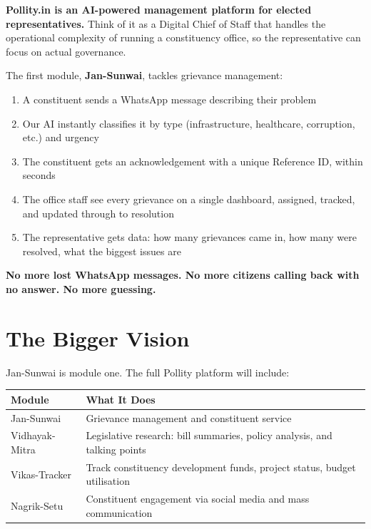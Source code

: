 \documentclass[11pt, a4paper]{article}
\begin{document}
\begin{tcolorbox}[colback=pollityblue!8, colframe=pollityblue, sharp corners, boxrule=0.6pt]
\textbf{Pollity.in is an AI-powered management platform for elected representatives.}
Think of it as a Digital Chief of Staff that handles the operational complexity of running a constituency office, so the representative can focus on actual governance.
\end{tcolorbox}

\vspace{0.8em}

The first module, \textbf{Jan-Sunwai}, tackles grievance management:

\begin{enumerate}[leftmargin=1.5em, itemsep=4pt]
  \item A constituent sends a WhatsApp message describing their problem
  \item Our AI instantly classifies it by type (infrastructure, healthcare, corruption, etc.) and urgency
  \item The constituent gets an acknowledgement with a unique Reference ID, within seconds
  \item The office staff see every grievance on a single dashboard, assigned, tracked, and updated through to resolution
  \item The representative gets data: how many grievances came in, how many were resolved, what the biggest issues are
\end{enumerate}

\vspace{0.5em}

\textbf{No more lost WhatsApp messages. No more citizens calling back with no answer. No more guessing.}

\section{The Bigger Vision}

Jan-Sunwai is module one. The full Pollity platform will include:

\begin{tabularx}{\linewidth}{lX}
\toprule
\textbf{Module} & \textbf{What It Does} \\
\midrule
Jan-Sunwai      & Grievance management and constituent service \\
Vidhayak-Mitra  & Legislative research: bill summaries, policy analysis, and talking points \\
Vikas-Tracker   & Track constituency development funds, project status, budget utilisation \\
Nagrik-Setu     & Constituent engagement via social media and mass communication \\
\bottomrule
\end{tabularx}
\end{document}
